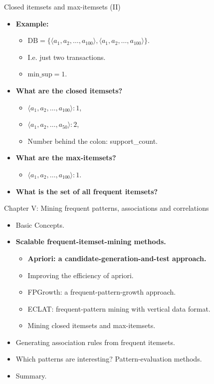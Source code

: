\documentclass[aspectratio=169,t]{beamer}
\begin{document}
  { 
    \begin{frame}{Closed itemsets and max-itemsets (II)}
    \begin{itemize}
      \item \textbf{Example:}
      \begin{itemize}
        \item $\text{DB} = \{\langle a_1,a_2, \ldots, a_{100} \rangle, \langle a_1, a_2, \ldots, a_{100} \rangle \}$.
        \item I.e. just two transactions.
        \item $\text{min\_sup} = 1$.
      \end{itemize}
      \item \textbf{What are the closed itemsets?}
      \begin{itemize}
        \item $\langle a_1,a_2, \ldots, a_{100} \rangle : 1$,
        \item $\langle a_1,a_2, \ldots, a_{50} \rangle : 2$,
        \item Number behind the colon: support\_count.
      \end{itemize}
      \item \textbf{What are the max-itemsets?}
      \begin{itemize}
        \item $\langle a_1,a_2, \ldots, a_{100} \rangle : 1$.
      \end{itemize}
      \item \textbf{What is the set of all frequent itemsets?}
    \end{itemize}
    \end{frame}
  }

  { 
    \begin{frame}{Chapter V: Mining frequent patterns, associations and correlations}
        \begin{itemize}
            \item Basic Concepts.
            \item \textbf{Scalable frequent-itemset-mining methods.}
            \begin{itemize}
              \item \textbf{Apriori: a candidate-generation-and-test approach.}
              \item Improving the efficiency of apriori.
              \item FPGrowth:  a frequent-pattern-growth approach.
              \item ECLAT: frequent-pattern mining with vertical data format.
              \item Mining closed itemsets and max-itemsets.
            \end{itemize}
            \item Generating association rules from frequent itemsets.
            \item Which patterns are interesting? Pattern-evaluation methods.
            \item Summary.
        \end{itemize}
    \end{frame}
  }
\end{document}
